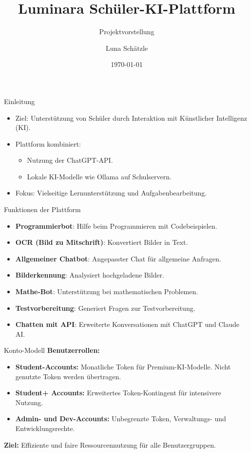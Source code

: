 \documentclass{beamer}
\title{Luminara Schüler-KI-Plattform}
\subtitle{Projektvorstellung}
\author{Luna Schätzle}
\date{\today}
\begin{document}
\begin{frame}
    \titlepage
\end{frame}

\begin{frame}{Einleitung}
    \begin{itemize}
        \item Ziel: Unterstützung von Schüler durch Interaktion mit Künstlicher Intelligenz (KI).
        \item Plattform kombiniert:
        \begin{itemize}
            \item Nutzung der ChatGPT-API.
            \item Lokale KI-Modelle wie Ollama auf Schulservern.
        \end{itemize}
        \item Fokus: Vielseitige Lernunterstützung und Aufgabenbearbeitung.
    \end{itemize}
\end{frame}

\begin{frame}{Funktionen der Plattform}
    \begin{itemize}
        \item \textbf{Programmierbot}: Hilfe beim Programmieren mit Codebeispielen.
        \item \textbf{OCR (Bild zu Mitschrift)}: Konvertiert Bilder in Text.
        \item \textbf{Allgemeiner Chatbot}: Angepasster Chat für allgemeine Anfragen.
        \item \textbf{Bilderkennung}: Analysiert hochgeladene Bilder.
        \item \textbf{Mathe-Bot}: Unterstützung bei mathematischen Problemen.
        \item \textbf{Testvorbereitung}: Generiert Fragen zur Testvorbereitung.
        \item \textbf{Chatten mit API}: Erweiterte Konversationen mit ChatGPT und Claude AI.
    \end{itemize}
\end{frame}

\begin{frame}{Konto-Modell}
    \textbf{Benutzerrollen:}
    \begin{itemize}
        \item \textbf{Student-Accounts:} Monatliche Token für Premium-KI-Modelle. Nicht genutzte Token werden übertragen.
        \item \textbf{Student+ Accounts:} Erweitertes Token-Kontingent für intensivere Nutzung.
        \item \textbf{Admin- und Dev-Accounts:} Unbegrenzte Token, Verwaltungs- und Entwicklungsrechte.
    \end{itemize}
    \textbf{Ziel:} Effiziente und faire Ressourcennutzung für alle Benutzergruppen.
\end{frame}
\end{document}
